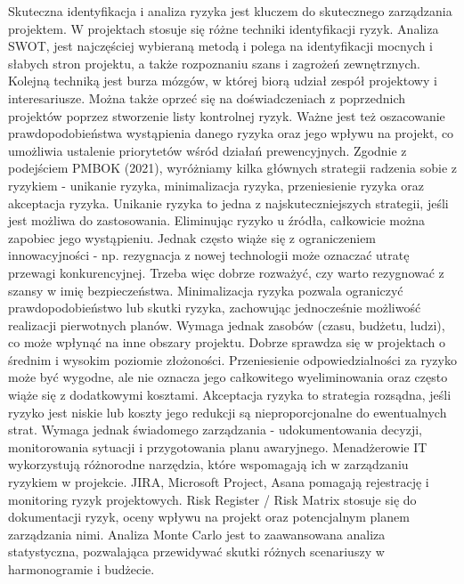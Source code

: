     Skuteczna identyfikacja i analiza ryzyka jest kluczem do skutecznego zarządzania projektem. W projektach stosuje się różne techniki identyfikacji ryzyk. Analiza SWOT, jest najczęściej wybieraną metodą i polega na identyfikacji mocnych i słabych stron projektu, a także rozpoznaniu szans i zagrożeń zewnętrznych. Kolejną techniką jest burza mózgów, w której biorą udział zespół projektowy i interesariusze. Można także oprzeć się na doświadczeniach z poprzednich projektów poprzez stworzenie listy kontrolnej ryzyk. Ważne jest też oszacowanie prawdopodobieństwa wystąpienia danego ryzyka oraz jego wpływu na projekt, co umożliwia ustalenie priorytetów wśród działań prewencyjnych. Zgodnie z podejściem PMBOK (2021), wyróżniamy kilka głównych strategii radzenia sobie z ryzykiem - unikanie ryzyka, minimalizacja ryzyka, przeniesienie ryzyka oraz akceptacja ryzyka. Unikanie ryzyka to jedna z najskuteczniejszych strategii, jeśli jest możliwa do zastosowania. Eliminując ryzyko u źródła, całkowicie można zapobiec jego wystąpieniu. Jednak często wiąże się z ograniczeniem innowacyjności - np. rezygnacja z nowej technologii może oznaczać utratę przewagi konkurencyjnej. Trzeba więc dobrze rozważyć, czy warto rezygnować z szansy w imię bezpieczeństwa. Minimalizacja ryzyka pozwala ograniczyć prawdopodobieństwo lub skutki ryzyka, zachowując jednocześnie możliwość realizacji pierwotnych planów. Wymaga jednak zasobów (czasu, budżetu, ludzi), co może wpłynąć na inne obszary projektu. Dobrze sprawdza się w projektach o średnim i wysokim poziomie złożoności. Przeniesienie odpowiedzialności za ryzyko może być wygodne, ale nie oznacza jego całkowitego wyeliminowania oraz często wiąże się z dodatkowymi kosztami. Akceptacja ryzyka to strategia rozsądna, jeśli ryzyko jest niskie lub koszty jego redukcji są nieproporcjonalne do ewentualnych strat. Wymaga jednak świadomego zarządzania - udokumentowania decyzji, monitorowania sytuacji i przygotowania planu awaryjnego. Menadżerowie IT wykorzystują różnorodne narzędzia, które wspomagają ich w zarządzaniu ryzykiem w projekcie. JIRA, Microsoft Project, Asana pomagają rejestrację i monitoring ryzyk projektowych. Risk Register / Risk Matrix stosuje się do dokumentacji ryzyk, oceny wpływu na projekt oraz potencjalnym planem zarządzania nimi. Analiza Monte Carlo jest to zaawansowana analiza statystyczna, pozwalająca przewidywać skutki różnych scenariuszy w harmonogramie i budżecie.
